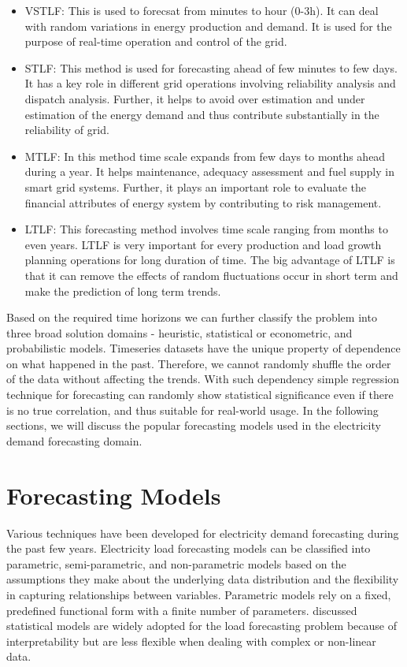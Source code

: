 \documentclass[mstat,12pt]{unswthesis}
\begin{document}
\begin{itemize}
\item
  VSTLF: This is used to forecsat from minutes to hour (0-3h). It can
  deal with random variations in energy production and demand. It is
  used for the purpose of real-time operation and control of the grid.
\item
  STLF: This method is used for forecasting ahead of few minutes to few
  days. It has a key role in different grid operations involving
  reliability analysis and dispatch analysis. Further, it helps to avoid
  over estimation and under estimation of the energy demand and thus
  contribute substantially in the reliability of grid.
\item
  MTLF: In this method time scale expands from few days to months ahead
  during a year. It helps maintenance, adequacy assessment and fuel
  supply in smart grid systems. Further, it plays an important role to
  evaluate the financial attributes of energy system by contributing to
  risk management.
\item
  LTLF: This forecasting method involves time scale ranging from months
  to even years. LTLF is very important for every production and load
  growth planning operations for long duration of time. The big
  advantage of LTLF is that it can remove the effects of random
  fluctuations occur in short term and make the prediction of long term
  trends.
\end{itemize}

\bigskip

Based on the required time horizons we can further classify the problem
into three broad solution domains - heuristic, statistical or
econometric, and probabilistic models. Timeseries datasets have the
unique property of dependence on what happened in the past. Therefore,
we cannot randomly shuffle the order of the data without affecting the
trends. With such dependency simple regression technique for forecasting
can randomly show statistical significance even if there is no true
correlation, and thus suitable for real-world usage. In the following
sections, we will discuss the popular forecasting models used in the
electricity demand forecasting domain.

\section{Forecasting Models}\label{forecasting-models}

Various techniques have been developed for electricity demand
forecasting during the past few years. Electricity load forecasting
models can be classified into parametric, semi-parametric, and
non-parametric models based on the assumptions they make about the
underlying data distribution and the flexibility in capturing
relationships between variables. Parametric models rely on a fixed,
predefined functional form with a finite number of parameters.
\cite{Fan2012} discussed statistical models are widely adopted for the
load forecasting problem because of interpretability but are less
flexible when dealing with complex or non-linear data.
\end{document}
